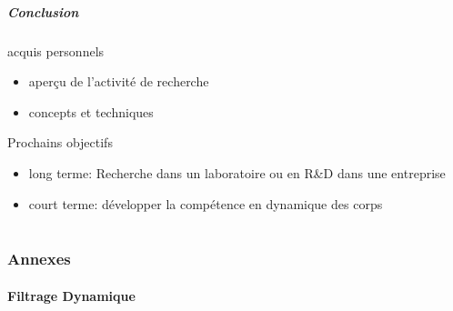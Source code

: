 \documentclass[10pt]{beamer}
\begin{document}
\begin{frame}
  \frametitle{Conclusion}
  
  \begin{block}{acquis personnels}
  \begin{itemize}
  \item aperçu de l'activité de recherche
  \item concepts et techniques
  \end{itemize}
  \end{block}
  
  \begin{block}{Prochains objectifs}
  \begin{itemize}
  \item long terme: Recherche dans un laboratoire ou en R\&D dans une entreprise
  \item court terme: développer la compétence en dynamique des corps
  \end{itemize}
  \end{block}
  
\end{frame}


\part{}
\section{Annexes}

\subsection{Filtrage Dynamique}
\end{document}

